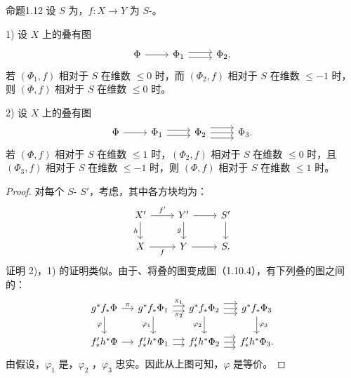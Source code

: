 \begin{SGAresult}{命题}{1.12}
设 $S$ 为，$f:X\to Y$ 为 $S$-。

1) 设 $X$ 上的叠有图
\[
\begin{tikzcd}
\Phi\arrow[r]&\Phi_1\arrow[r,shift left=.6ex]\arrow[r,shift right=.6ex]&\Phi_2.
\end{tikzcd}
\]
若 $(\Phi_1,f)$ 相对于 $S$ 在维数 $\leqslant0$ 时，而 $(\Phi_2,f)$ 相对于 $S$ 在维数 $\leqslant-1$ 时，则 $(\Phi,f)$ 相对于 $S$ 在维数 $\leqslant0$ 时。

2) 设 $X$ 上的叠有图
\[
\begin{tikzcd}
\Phi\arrow[r]&\Phi_1\arrow[r,shift left=.6ex]\arrow[r,shift right=.6ex]&\Phi_2\arrow[r,shift left=1.2ex]\arrow[r]\arrow[r,shift right=1.2ex]&\Phi_3.
\end{tikzcd}
\]
若 $(\Phi,f)$ 相对于 $S$ 在维数 $\leqslant1$ 时，$(\Phi_2,f)$ 相对于 $S$ 在维数 $\leqslant0$ 时，且 $(\Phi_3,f)$ 相对于 $S$ 在维数 $\leqslant-1$ 时，则 $(\Phi,f)$ 相对于 $S$ 在维数 $\leqslant1$ 时。
\end{SGAresult}
\begin{proof}
对每个 $S$- $S'$，考虑，其中各方块均为：
\[
\begin{tikzcd}
X'\arrow[r,"f'"]\arrow[d,"h"']&Y'\arrow[r]\arrow[d,"g"']&S'\arrow[d]\\
X\arrow[r,"f"']&Y\arrow[r]&S.
\end{tikzcd}
\]
证明 2)，1) 的证明类似。由于、将叠的图变成图（1.10.4），有下列叠的图之间的：
\[
\begin{tikzcd}[column sep=1.2em]
g^*f_*\Phi\arrow[r,"\pi"]\arrow[d,"\varphi"']&g^*f_*\Phi_1\arrow[r,shift left=.6ex,"\pi_1"]\arrow[r,shift right=.6ex,"\pi_2"']\arrow[d,"\varphi_1"']&g^*f_*\Phi_2\arrow[r,shift left=1.2ex]\arrow[r]\arrow[r,shift right=1.2ex]\arrow[d,"\varphi_2"']&g^*f_*\Phi_3\arrow[d,"\varphi_3"]\\
f'_*h^*\Phi\arrow[r]&f'_*h^*\Phi_1\arrow[r,shift left=.6ex]\arrow[r,shift right=.6ex]&f'_*h^*\Phi_2\arrow[r,shift left=1.2ex]\arrow[r]\arrow[r,shift right=1.2ex]&f'_*h^*\Phi_3.
\end{tikzcd}
\]
由假设，$\varphi_1$ 是，$\varphi_2$ ，$\varphi_3$ 忠实。因此从上图可知，$\varphi$ 是等价。
\end{proof}

